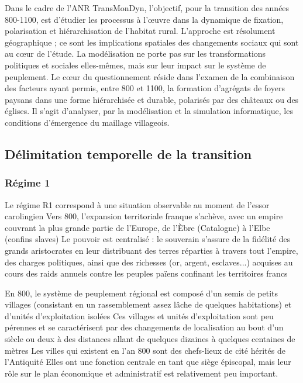 Dans le cadre de l'ANR TransMonDyn, l'objectif, pour la transition des années 800-1100, est d'étudier les processus à l'œuvre dans la dynamique de fixation, polarisation et hiérarchisation de l'habitat rural.
L'approche est résolument géographique ; ce sont les implications spatiales des changements sociaux qui sont au cœur de l'étude.
La modélisation ne porte pas sur les transformations politiques et sociales elles-mêmes, mais sur leur impact sur le système de peuplement.
Le cœur du questionnement réside dans l'examen de la combinaison des facteurs ayant permis, entre 800 et 1100, la formation d'agrégats de foyers paysans dans une forme hiérarchisée et durable, polarisés par des châteaux ou des églises.
Il s'agit d'analyser, par la modélisation et la simulation informatique, les conditions d'émergence du maillage villageois.

\subsection{Délimitation temporelle de la transition}

\subsubsection{Régime 1}

Le régime R1 correspond à une situation observable au moment de l'essor carolingien
Vers 800, l'expansion territoriale franque s'achève, avec un empire couvrant la plus grande partie de l'Europe, de l'Èbre (Catalogne) à l'Elbe (confins slaves)
Le pouvoir est centralisé : le souverain s'assure de la fidélité des grands aristocrates en leur distribuant des terres réparties à travers tout l'empire, des charges politiques, ainsi que des richesses (or, argent, esclaves...) acquises au cours des raids annuels contre les peuples païens confinant les territoires francs

En 800, le système de peuplement régional est composé d'un semis de petits villages (consistant en un rassemblement assez lâche de quelques habitations) et d'unités d'exploitation isolées
Ces villages et unités d'exploitation sont peu pérennes et se caractérisent par des changements de localisation au bout d'un siècle ou deux à des distances allant de quelques dizaines à quelques centaines de mètres
Les villes qui existent en l'an 800 sont des chefs-lieux de cité hérités de l'Antiquité
Elles ont une fonction centrale en tant que siège épiscopal, mais leur rôle sur le plan économique et administratif est relativement peu important.


